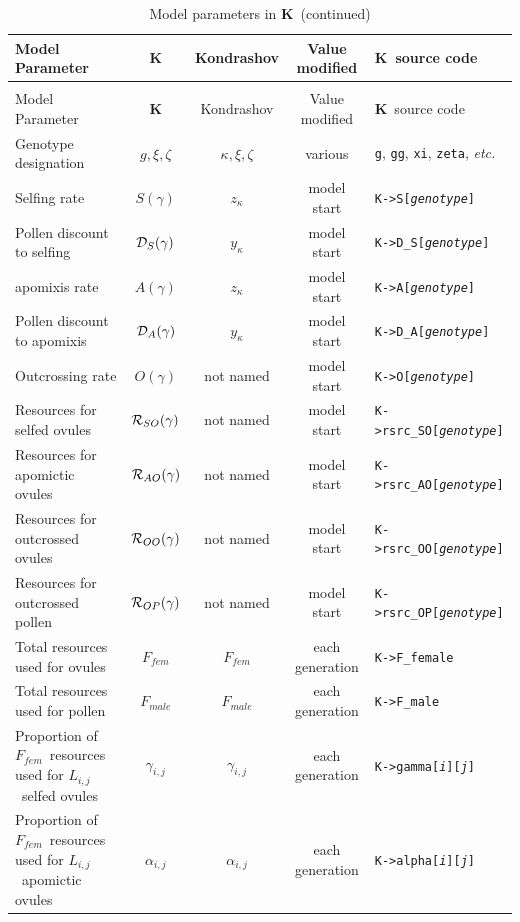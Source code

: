 \documentclass[12pt,twoside,letterpaper,fleqn]{report}
\numberwithin{equation}{section}  %
\newcommand{\K}{{\bf K}}
\newcommand{\Kmember}[1]{\mbox{{\tt K->#1}}}
\newcommand{\Kmemberi}[2]{\mbox{{\tt K->#1[{\it #2}\/]}}}
\newcommand{\Kmemberij}[3]{\mbox{{\tt K->#1[{\it #2}\/][{\it #3}\/]}}}
\newcommand{\Lij}{\mbox{$L_{i,j}$}}              %
\newcommand{\Sg}{\mbox{$S(\gamma)$}}
\newcommand{\DSg}{\mbox{${\cal D}_{S}(\gamma)$}}
\newcommand{\Ag}{\mbox{$A(\gamma)$}}
\newcommand{\DAg}{\mbox{${\cal D}_{A}(\gamma)$}}
\newcommand{\Og}{\mbox{$O(\gamma)$}}
\newcommand{\RSOg}{\mbox{${\cal R}_{SO}(\gamma)$}}
\newcommand{\RAOg}{\mbox{${\cal R}_{AO}(\gamma)$}}
\newcommand{\ROOg}{\mbox{${\cal R}_{OO}(\gamma)$}}
\newcommand{\ROPg}{\mbox{${\cal R}_{OP}(\gamma)$}}
\newcommand{\Ffemale}{\mbox{$F_{fem}$}}
\newcommand{\Fmale}{\mbox{$F_{male}$}}
\newcommand{\gammaij}{\mbox{$\gamma_{i,j}$}}
\newcommand{\alphaij}{\mbox{$\alpha_{i,j}$}}
\begin{document}
{\begin{landscape}

\label{tab:modelparameters}
\begin{longtable}{p{2in}|c|c|c|l}
\caption{Model parameters in \K} \\
Model Parameter			        &	\K              	&	Kondrashov		& Value modified & \K\ source code       \\ \hline
\endfirsthead
\caption{Model parameters in \K\ (continued)} \\
Model Parameter			        &	\K              	&	Kondrashov		& Value modified & \K\ source code       \\ \hline
\endhead
Genotype designation	      & $g, \xi, \zeta$	& $\kappa, \xi, \zeta$	& various & {\tt g}, {\tt gg}, {\tt xi}, {\tt zeta}, {\em etc.} \\
Selfing rate								& \Sg							& $z_\kappa$		& model start &	\Kmemberi{S}{genotype}   \\
Pollen discount to selfing	& \DSg						& $y_\kappa$		& model start &  \Kmemberi{D\_S}{genotype} \\
apomixis rate								& \Ag							& $z_\kappa$\dag 	&	model start & \Kmemberi{A}{genotype}   \\
Pollen discount to apomixis	& \DAg						& $y_\kappa$\dag	& model start & \Kmemberi{D\_A}{genotype} \\
Outcrossing rate						& \Og							& not named   	&	model start &	\Kmemberi{O}{genotype} \\
Resources for selfed ovules & \RSOg           & not named			& model start &	\Kmemberi{rsrc\_SO}{genotype} \\
Resources for apomictic ovules & \RAOg        & not named			& model start &	\Kmemberi{rsrc\_AO}{genotype} \\
Resources for outcrossed ovules & \ROOg       & not named			& model start &	\Kmemberi{rsrc\_OO}{genotype} \\
Resources for outcrossed pollen & \ROPg       & not named			& model start &	\Kmemberi{rsrc\_OP}{genotype} \\
Total resources used for ovules	& \Ffemale				&	\Ffemale			& each generation & \Kmember{F\_female} \\
Total resources used for pollen	& \Fmale					&	\Fmale				& each generation & \Kmember{F\_male} \\
Proportion of \Ffemale\ resources used for \Lij\ selfed ovules	&	\gammaij	&	\gammaij			& each generation & \Kmemberij{gamma}{i}{j} \\
Proportion of \Ffemale\ resources used for \Lij\ apomictic ovules	&	\alphaij	&	\alphaij	& each generation & \Kmemberij{alpha}{i}{j} \\

\end{longtable}
\end{landscape}}
\end{document}
